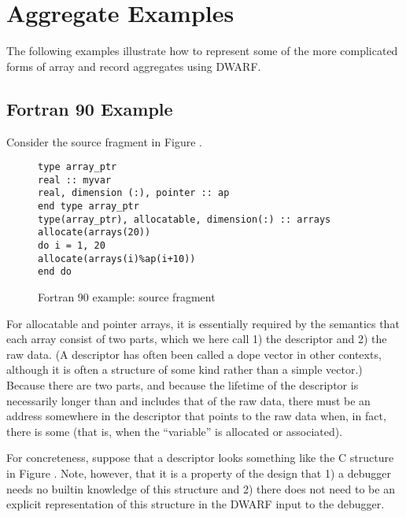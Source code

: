 \clearpage

\section{Aggregate Examples}
\label{app:aggregateexamples}

The following examples illustrate how to represent some of
the more complicated forms of array and record aggregates
using DWARF.

\subsection{Fortran 90 Example}
\label{app:fortran90example}
Consider the  source fragment in 
Figure .

\begin{figure}[here]
\begin{lstlisting}
type array_ptr
real :: myvar
real, dimension (:), pointer :: ap
end type array_ptr
type(array_ptr), allocatable, dimension(:) :: arrays
allocate(arrays(20))
do i = 1, 20
allocate(arrays(i)%ap(i+10))
end do
\end{lstlisting}
\caption{Fortran 90 example: source fragment} \label{fig:fortran90examplesourcefragment}
\end{figure}

For allocatable and pointer arrays, it is essentially required
by the  semantics that each array consist of 
two
parts, which we here call 1) the descriptor and 2) the raw
data. (A descriptor has often been called a dope vector in
other contexts, although it is often a structure of some kind
rather than a simple vector.) Because there are two parts,
and because the lifetime of the descriptor is necessarily
longer than and includes that of the raw data, there must be
an address somewhere in the descriptor that points to the
raw data when, in fact, there is some (that is, when 
the ``variable'' is allocated or associated).

For concreteness, suppose that a descriptor looks something
like the C structure in 
Figure .
Note, however, that it is
a property of the design that 1) a debugger needs no builtin
knowledge of this structure and 2) there does not need to
be an explicit representation of this structure in the DWARF
input to the 
debugger.

